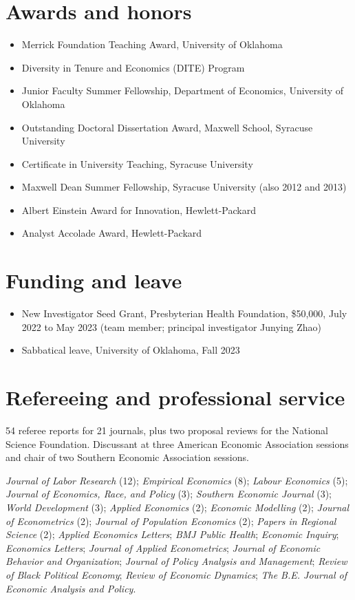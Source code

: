 \documentclass[10.5pt]{article}
\begin{document}
\section{Awards and honors}
\begin{itemize}
\item[\textbf{2026}] Merrick Foundation Teaching Award, University of Oklahoma
\item[\textbf{2017}] Diversity in Tenure and Economics (DITE) Program
\item[\textbf{2015}] Junior Faculty Summer Fellowship, Department of Economics, University of Oklahoma
\item[\textbf{2014}] Outstanding Doctoral Dissertation Award, Maxwell School, Syracuse University
\item[\textbf{2013}] Certificate in University Teaching, Syracuse University
\item[\textbf{2010}] Maxwell Dean Summer Fellowship, Syracuse University (also 2012 and 2013)
\item[\textbf{2008}] Albert Einstein Award for Innovation, Hewlett-Packard
\item[\textbf{2007}] Analyst Accolade Award, Hewlett-Packard
\end{itemize}
\section{Funding and leave}
\begin{itemize}
\item New Investigator Seed Grant, Presbyterian Health Foundation, \$50,000, July 2022 to May 2023 (team member; principal investigator Junying Zhao)
\item Sabbatical leave, University of Oklahoma, Fall 2023
\end{itemize}
\section{Refereeing and professional service}
54 referee reports for 21 journals, plus two proposal reviews for the National Science Foundation. Discussant at three American Economic Association sessions and chair of two Southern Economic Association sessions.\par
{\small \emph{Journal of Labor Research} (12); \emph{Empirical Economics} (8); \emph{Labour Economics} (5); \emph{Journal of Economics, Race, and Policy} (3); \emph{Southern Economic Journal} (3); \emph{World Development} (3); \emph{Applied Economics} (2); \emph{Economic Modelling} (2); \emph{Journal of Econometrics} (2); \emph{Journal of Population Economics} (2); \emph{Papers in Regional Science} (2); \emph{Applied Economics Letters}; \emph{BMJ Public Health}; \emph{Economic Inquiry}; \emph{Economics Letters}; \emph{Journal of Applied Econometrics}; \emph{Journal of Economic Behavior and Organization}; \emph{Journal of Policy Analysis and Management}; \emph{Review of Black Political Economy}; \emph{Review of Economic Dynamics}; \emph{The B.E. Journal of Economic Analysis and Policy}.}
\end{document}
